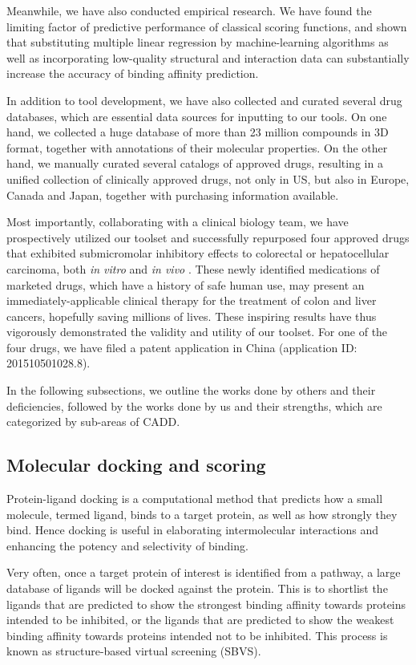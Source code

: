 \documentclass[a4paper,12pt]{article}
\begin{document}
Meanwhile, we have also conducted empirical research. We have found the limiting factor of predictive performance of classical scoring functions, and shown that substituting multiple linear regression by machine-learning algorithms as well as incorporating low-quality structural and interaction data can substantially increase the accuracy of binding affinity prediction.

In addition to tool development, we have also collected and curated several drug databases, which are essential data sources for inputting to our tools. On one hand, we collected a huge database of more than 23 million compounds in 3D format, together with annotations of their molecular properties. On the other hand, we manually curated several catalogs of approved drugs, resulting in a unified collection of clinically approved drugs, not only in US, but also in Europe, Canada and Japan, together with purchasing information available.

Most importantly, collaborating with a clinical biology team, we have prospectively utilized our toolset and successfully repurposed four approved drugs that exhibited submicromolar inhibitory effects to colorectal or hepatocellular carcinoma, both \textit{in vitro} and \textit{in vivo} \citep{1667,1681}. These newly identified medications of marketed drugs, which have a history of safe human use, may present an immediately-applicable clinical therapy for the treatment of colon and liver cancers, hopefully saving millions of lives. These inspiring results have thus vigorously demonstrated the validity and utility of our toolset. For one of the four drugs, we have filed a patent application in China (application ID: 201510501028.8).

In the following subsections, we outline the works done by others and their deficiencies, followed by the works done by us and their strengths, which are categorized by sub-areas of CADD.

\subsection*{Molecular docking and scoring}

Protein-ligand docking is a computational method that predicts how a small molecule, termed ligand, binds to a target protein, as well as how strongly they bind. Hence docking is useful in elaborating intermolecular interactions and enhancing the potency and selectivity of binding.

Very often, once a target protein of interest is identified from a pathway, a large database of ligands will be docked against the protein. This is to shortlist the ligands that are predicted to show the strongest binding affinity towards proteins intended to be inhibited, or the ligands that are predicted to show the weakest binding affinity towards proteins intended not to be inhibited. This process is known as structure-based virtual screening (SBVS).
\end{document}
